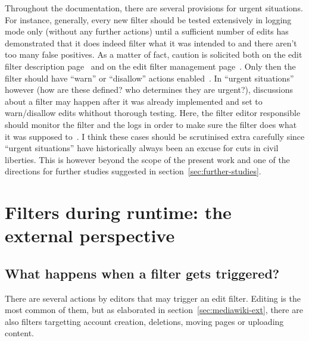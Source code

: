 Throughout the documentation, there are several provisions for urgent situations.
For instance, generally, every new filter should be tested extensively in logging mode only (without any further actions) until a sufficient number of edits has demonstrated that it does indeed filter what it was intended to and there aren't too many false positives.
As a matter of fact, caution is solicited both on the edit filter description page~\cite{Wikipedia:EditFilter} and on the edit filter management page~\cite{Wikipedia:EditFilterManagement}.
Only then the filter should have ``warn'' or ``disallow'' actions enabled~\cite{Wikipedia:EditFilter}.
In ``urgent situations'' however (how are these defined? who determines they are urgent?), discussions about a filter may happen after it was already implemented and set to warn/disallow edits whithout thorough testing.
Here, the filter editor responsible should monitor the filter and the logs in order to make sure the filter does what it was supposed to~\cite{Wikipedia:EditFilter}.
I think these cases should be scrutinised extra carefully since ``urgent situations'' have historically always been an excuse for cuts in civil liberties.
This is however beyond the scope of the present work and one of the directions for further studies suggested in section~\ref{sec:further-studies}.


\section{Filters during runtime: the external perspective}
\subsection{What happens when a filter gets triggered?}

There are several actions by editors that may trigger an edit filter.
Editing is the most common of them, but as elaborated in section~\ref{sec:mediawiki-ext}, there are also filters targetting account creation, deletions, moving pages or uploading content.

